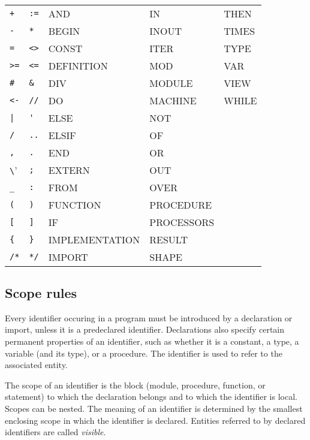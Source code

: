 \begin{description}
{\small \tt
\begin{tabular}{lllll}
\verb'+' & \verb':='  & AND            & IN        & THEN\\
\verb'-' & \verb'*'   & BEGIN          & INOUT     & TIMES\\
\verb'=' & \verb'<>'  & CONST          & ITER      & TYPE\\
\verb'>=' & \verb'<=' & DEFINITION     & MOD       & VAR\\
\verb'#' & \verb'&'   & DIV            & MODULE    & VIEW\\
\verb'<-' & \verb"//" & DO             & MACHINE   & WHILE\\    
\verb'|' & \verb"'"   & ELSE           & NOT\\	   
\verb'/' & \verb'..'  & ELSIF          & OF\\
\verb',' & \verb'.'   & END            & OR\\
\verb'\' & \verb';'   & EXTERN	       & OUT\\
\verb'_' & \verb':'   & FROM           & OVER\\
\verb'(' & \verb')'   & FUNCTION       & PROCEDURE\\
\verb'[' & \verb']'   & IF             & PROCESSORS\\
\verb'{' & \verb'}'   & IMPLEMENTATION & RESULT\\
\verb'/*' & \verb'*/' & IMPORT         & SHAPE\\
\end{tabular}}

\end{description}

\subsection*{Scope rules}

Every identifier occuring in a program must be introduced by a
declaration or import, unless it is a predeclared
identifier. Declarations also specify certain permanent properties of
an identifier, such as whether it is a constant, a type, a variable
(and its type), or a procedure.  The identifier is used to refer to
the associated entity.

The scope of an identifier is the block (module, procedure, function,
or statement) to which the declaration belongs and to which the
identifier is local. Scopes can be nested. The meaning of an
identifier is determined by the smallest enclosing scope in which the
identifier is declared. Entities referred to by declared identifiers
are called {\em visible}.

